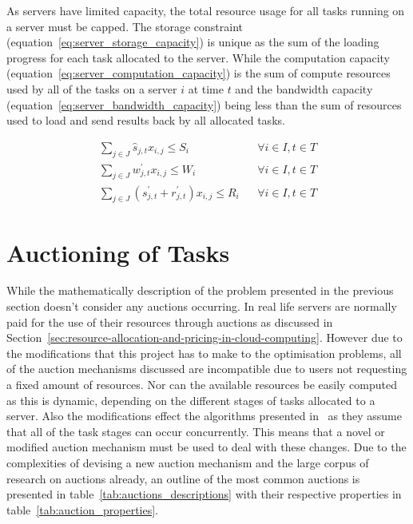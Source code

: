 As servers have limited capacity, the total resource usage for all tasks running on a server must be capped.
The storage constraint (equation~\eqref{eq:server_storage_capacity}) is unique as the sum of the loading progress for
each task allocated to the server. While the computation capacity (equation~\eqref{eq:server_computation_capacity}) is
the sum of compute resources used by all of the tasks on a server $i$ at time $t$ and the bandwidth capacity
(equation~\eqref{eq:server_bandwidth_capacity}) being less than the sum of resources used to load and send results back
by all allocated tasks.

\begin{align}
    \sum_{j \in J} \hat{s}_{j,t} x_{i,j} \leq S_i && \forall{i \in I, t \in T} \label{eq:server_storage_capacity} \\
    \sum_{j \in J} w^{'}_{j,t} x_{i,j} \leq W_i && \forall{i \in I, t \in T} \label{eq:server_computation_capacity} \\
    \sum_{j \in J} (s^{'}_{j,t} + r^{'}_{j,t}) x_{i,j} \leq R_i && \forall{i \in I, t \in T} \label{eq:server_bandwidth_capacity}
\end{align}

\section{Auctioning of Tasks}\label{sec:auctioning-of-tasks}
While the mathematically description of the problem presented in the previous section doesn't consider any auctions
occurring. In real life servers are normally paid for the use of their resources through auctions as discussed in
Section~\ref{sec:resource-allocation-and-pricing-in-cloud-computing}. However due to the modifications
that this project has to make to the optimisation problems, all of the auction mechanisms discussed are incompatible
due to users not requesting a fixed amount of resources. Nor can the available resources be easily computed as this is
dynamic, depending on the different stages of tasks allocated to a server. Also the modifications effect the algorithms
presented in~\cite{FlexibleResourceAllocation} as they assume that all of the task stages can occur concurrently. This
means that a novel or modified auction mechanism must be used to deal with these changes. Due to the complexities of
devising a new auction mechanism and the large corpus of research on auctions already, an outline of the most common
auctions is presented in table~\ref{tab:auctions_descriptions} with their respective properties in
table~\ref{tab:auction_properties}.

